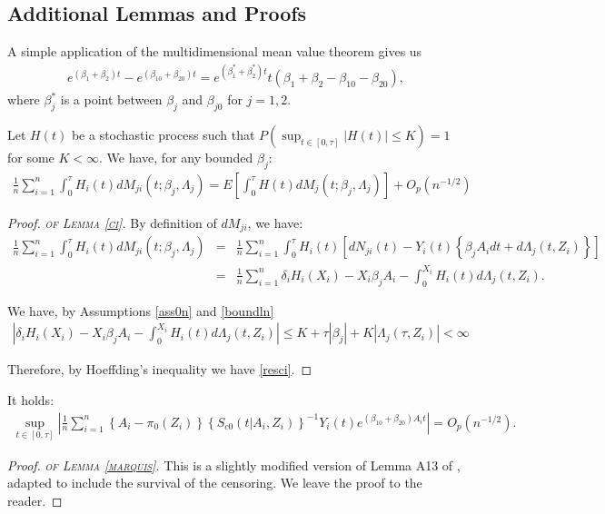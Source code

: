\documentclass[11pt]{article}
\newcommand{\ee}{\end{eqnarray}}
\newcommand{\eqnn}{\begin{eqnarray*}}
\newcommand{\een}{\end{eqnarray*}}
\newcommand{\be}{\begin{eqnarray}}
\begin{document}


\subsection{Additional Lemmas and Proofs}



\begin{lemmas}\label{mvt}
A simple application of the multidimensional mean value theorem gives us
\eqnn
e^{(\beta_1+\beta_2)t}-e^{(\beta_{10}+\beta_{20})t}=e^{(\beta^*_1+\beta^*_2)t}t\left(\beta_1+\beta_2-\beta_{10}-\beta_{20}\right),
\een
where $\beta^{*}_j$ is a point between $\beta_j$ and $\beta_{j0}$ for $j=1,2$.
\end{lemmas}

\begin{lemmas}\label{ci}
Let $H(t)$ be a stochastic process such that $P\left(\sup_{t \in [0,\tau]}|H(t)|\leq K\right)=1$ for some $K<\infty$. 
We have, for any bounded $\beta_j$:
\be\label{resci}
\frac{1}{n}\sum_{i=1}^n\int_0^\tau H_i(t)dM_{ji}(t ; \beta_{j}, \Lambda_{j})=E\left[\int_0^\tau H(t)dM_{j}(t ; \beta_{j}, \Lambda_{j})\right]+O_p(n^{-1/2})
\ee
\end{lemmas}
\newenvironment{newproof11}{\begin{proof}\textsc{\emph{of Lemma \ref{ci}.}}}{\end{proof}}

\begin{newproof11}
By definition of $dM_{ji}$, we have:
\eqnn
\frac{1}{n}\sum_{i=1}^n\int_0^\tau H_i(t)dM_{ji}(t ; \beta_{j}, \Lambda_{j})&=&\frac{1}{n}\sum_{i=1}^n\int_0^\tau H_i(t)\left[dN_{ji}(t)-Y_i(t)\left\{\beta_{j}A_idt+d\Lambda_{j}(t,Z_i)\right\}\right]\\
&=&\frac{1}{n}\sum_{i=1}^n\delta_i H_i(X_i)-X_i\beta_j A_i -\int_0^{X_i}H_i(t)d\Lambda_{j}(t,Z_i).
\een

We have, by Assumptions \ref{ass0n} and \ref{boundln}
\eqnn
\left|\delta_i H_i(X_i)-X_i\beta_j A_i -\int_0^{X_i}H_i(t)d\Lambda_{j}(t,Z_i)\right|\leq K+\tau |\beta_j|+K|\Lambda_j(\tau,Z_i)|<\infty
\een

Therefore, by Hoeffding's inequality we have \eqref{resci}.
\end{newproof11}

\newenvironment{newproof12}{\begin{proof}\textsc{\emph{of Lemma \ref{marquis}.}}}{\end{proof}}

\begin{lemmas}\label{marquis}
It holds:
\eqnn
\sup_{t \in [0,\tau]} \left|\frac{1}{n}\sum_{i=1}^n \left\{A_i-\pi_0(Z_i)\right\}\left\{S_{c0}(t | A_i,Z_i)\right\}^{-1}Y_i(t)e^{(\beta_{10}+\beta_{20})A_i t}\right|=O_p\left(n^{-1/2}\right).
\een
\end{lemmas}
\begin{newproof12}
This is a slightly modified version of Lemma A13 of \cite{hou2019estimating}, adapted to include the survival of the censoring. We leave the proof to the reader.
\end{newproof12}
\end{document}
